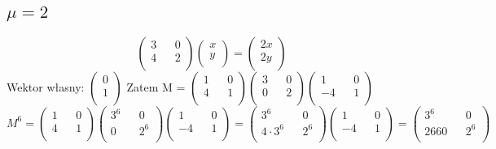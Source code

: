 \documentclass{article}
\begin{document}
\subsection*{$\mu = 2$}
$$
\begin{pmatrix}
3 && 0\\
4 && 2\\
\end{pmatrix}
\begin{pmatrix}
x\\
y\\
\end{pmatrix}
=
\begin{pmatrix}
2x\\
2y\\
\end{pmatrix}
$$
Wektor własny: $\begin{pmatrix}
0\\
1\\
\end{pmatrix}$
Zatem M = $\begin{pmatrix}
1 && 0\\
4 && 1\\
\end{pmatrix}
\begin{pmatrix}
3 && 0\\
0 && 2\\
\end{pmatrix}
\begin{pmatrix}
1 && 0\\
-4 && 1\\
\end{pmatrix}$
$$
M^6 = \begin{pmatrix}
1 && 0\\
4 && 1\\
\end{pmatrix}
\begin{pmatrix}
3^6 && 0\\
0 && 2^6\\
\end{pmatrix}
\begin{pmatrix}
1 && 0\\
-4 && 1\\
\end{pmatrix} =
\begin{pmatrix}
3^6 && 0\\
4\cdot3^6 && 2^6\\
\end{pmatrix}
\begin{pmatrix}
1 && 0\\
-4 && 1\\
\end{pmatrix}
= \begin{pmatrix}
3^6 && 0\\
2660 && 2^6\\
\end{pmatrix}
$$
\end{document}
